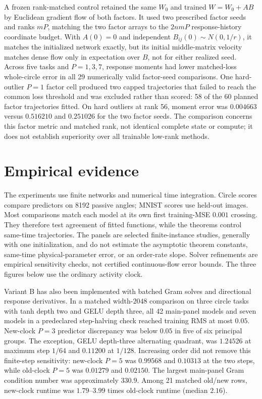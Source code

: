 \documentclass[11pt]{article}
\theoremstyle{definition}
\theoremstyle{remark}
\begin{document}
A frozen rank-matched control retained the same $W_0$ and trained
$W=W_0+AB$ by Euclidean gradient flow of both factors.  It used two prescribed
factor seeds and ranks $mP$, matching the two factor arrays to the
$2nmP$ response-history coordinate budget.  With $A(0)=0$ and independent
$B_{ij}(0)\sim N(0,1/r)$, it matches the initialized network exactly, but its
initial middle-matrix velocity matches dense flow only in expectation over
$B$, not for either realized seed.  Across five tasks and
$P=1,3,7$, response moments had lower matched-loss whole-circle error in all
29 numerically valid factor-seed comparisons.  One hard-outlier $P=1$ factor
cell produced two capped trajectories that failed to reach the common loss
threshold and was excluded rather than scored: 58 of the 60 planned factor
trajectories fitted.  On hard outliers at rank 56, moment error was
$0.004663$ versus $0.516210$ and $0.251026$ for the two factor seeds.
The comparison concerns this factor metric and matched rank, not identical
complete state or compute; it does not establish superiority over all
trainable low-rank methods.

\section{Empirical evidence}
\label{sec:experiments}

The experiments use finite networks and numerical time integration.  Circle
scores compare predictors on 8192 passive angles; MNIST scores use held-out
images.  Most comparisons match each model at its own first training-MSE
$0.001$ crossing.  They therefore test agreement of fitted functions, while
the theorems control same-time trajectories.  The panels are selected
finite-instance studies, generally with one initialization, and do not estimate
the asymptotic theorem constants, same-time physical-parameter error, or an
order-rate slope.  Solver refinements are empirical sensitivity checks, not
certified continuous-flow error bounds.  The three figures below use the
ordinary activity clock.

Variant B has also been implemented with batched Gram solves and directional
response derivatives.  In a matched width-$2048$ comparison on three circle
tasks with tanh depth two and GELU depth three, all 42 main-panel models and
seven models in a predeclared step-halving check reached training RMS at most
$0.05$.  New-clock $P=3$ predictor discrepancy was below $0.05$ in five of six
principal groups.  The exception, GELU depth-three alternating quadrant, was
$1.24526$ at maximum step $1/64$ and $0.11200$ at $1/128$.  Increasing order
did not remove this finite-step sensitivity: new-clock $P=5$ was $0.99568$ and
$0.10313$ at the two steps, while old-clock $P=5$ was $0.01279$ and $0.02150$.
The largest main-panel Gram condition number was approximately $330.9$.
Among 21 matched old/new rows, new-clock runtime was $1.79$--$3.99$ times
old-clock runtime (median $2.16$).
\end{document}
